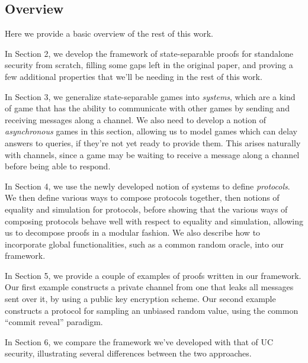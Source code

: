 \subsection{Overview}

Here we provide a basic overview of the rest of this work.

In Section 2, we develop the framework of state-separable proofs
for standalone security from scratch, filling some gaps
left in the original paper, and proving a few additional properties
that we'll be needing in the rest of this work.

In Section 3, we generalize state-separable games into \emph{systems},
which are a kind of game that has the ability to communicate
with other games by sending and receiving messages along a channel.
We also need to develop a notion of \emph{asynchronous} games
in this section, allowing us to model games which can delay
answers to queries, if they're not yet ready to provide them.
This arises naturally with channels, since a game may be waiting
to receive a message along a channel before being able to respond.

In Section 4, we use the newly developed notion of systems
to define \emph{protocols}.
We then define various ways to compose protocols together,
then notions of equality and simulation for protocols,
before showing that the various ways of composing protocols
behave well with respect to equality and simulation,
allowing us to decompose proofs in a modular fashion.
We also describe how to incorporate global functionalities,
such as a common random oracle, into our framework.

In Section 5, we provide a couple of examples of proofs written
in our framework.
Our first example constructs a private channel from one
that leaks all messages sent over it, by using a public key encryption scheme.
Our second example constructs a protocol for sampling
an unbiased random value, using the common ``commit reveal'' paradigm.


In Section 6, we compare the framework we've developed with
that of UC security, illustrating several differences
between the two approaches.
